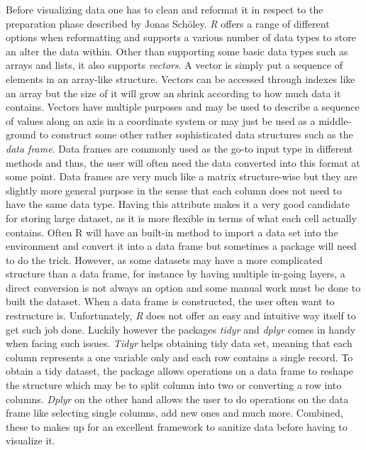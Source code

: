 \documentclass[Report.tex]{subfiles}
\begin{document}
 Before visualizing data one has to clean and reformat it in respect to the preparation phase described by Jonas Schöley. \textit{R} offers a range of different options when reformatting and supports a various number of data  types to store an alter the data within. Other than supporting some basic data types such as arrays and lists, it also supports \textit{vectors}. A vector is simply put a sequence of elements in an array-like structure. Vectors can be accessed through indexes like an array but the size of it will grow an shrink according to how much data it contains. Vectors have multiple purposes and may be used to describe a sequence of values along an axis in a coordinate system or may just be used as a middle-ground to construct some other rather sophisticated data structures such as the \textit{data frame}. Data frames are commonly used as the go-to input type in different methods and thus, the user will often need the data converted into this format at some point. Data frames are very much like a matrix structure-wise but they are slightly more general purpose in the sense that each column does not need to have the same data type. Having this attribute makes it a very good candidate for storing large dataset, as it is more flexible in terms of what each cell actually contains. Often R will have an built-in method to import a data set into the environment and convert it into a data frame but sometimes a package will need to do the trick. However, as some datasets may have a more complicated structure than a data frame, for instance by having multiple in-going layers, a direct conversion is not always an option and some manual work must be done to built the dataset. When a data frame is constructed, the user often want to restructure is. Unfortunately, \textit{R} does not offer an easy and intuitive way itself to get such job done. Luckily however the packages \textit{tidyr} and  \textit{dplyr} comes in handy when facing such issues. \textit{Tidyr} helps obtaining tidy data set, meaning that each column represents a one variable only and each row contains a single record. To obtain a tidy dataset, the package allows operations on a data frame to reshape the structure which may be to split column into two or converting a row into columns. \textit{Dplyr} on the other hand allows the user to do operations on the data frame like selecting single columns, add new ones and much more. Combined, these to makes up for an excellent framework to sanitize data before having to visualize it.\\
 
\end{document}
